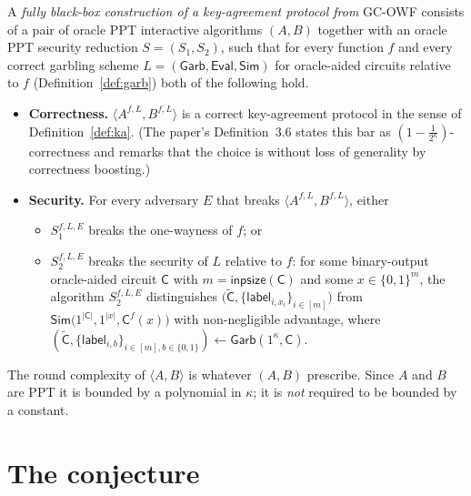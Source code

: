 \documentclass{aicr-conjecture}
\newcommand{\bits}{\{0,1\}}
\newcommand{\Cc}{\mathsf{C}}
\newcommand{\Ct}{\widetilde{\mathsf{C}}}
\newcommand{\lab}{\mathsf{label}}
\newcommand{\labset}[1]{\{\lab_{i,#1}\}}
\newcommand{\Garb}{\mathsf{Garb}}
\newcommand{\Evl}{\mathsf{Eval}}
\newcommand{\Sm}{\mathsf{Sim}}
\newcommand{\inpsize}{\mathsf{inpsize}}
\newcommand{\GCOWF}{\textup{GC-OWF}}
\begin{document}
\begin{definition}\label{def:bb}
A \emph{fully black-box construction of a key-agreement protocol from}
\GCOWF{} consists of a pair of oracle PPT interactive algorithms $(A,B)$
together with an oracle PPT security reduction $S=(S_1,S_2)$, such that
for every function $f$ and every correct garbling scheme
$L=(\Garb,\Evl,\Sm)$ for oracle-aided circuits relative to $f$
(Definition~\ref{def:garb}) both of the following hold.
\begin{itemize}
\item \textbf{Correctness.} $\langle A^{f,L},B^{f,L}\rangle$ is a correct
  key-agreement protocol in the sense of Definition~\ref{def:ka}. (The
  paper's Definition~3.6 states this bar as
  $(1-\frac{1}{2^{\kappa}})$-correctness and remarks that the choice is
  without loss of generality by correctness boosting.)
\item \textbf{Security.} For every adversary $E$ that breaks
  $\langle A^{f,L},B^{f,L}\rangle$, either
  \begin{itemize}
  \item $S_1^{f,L,E}$ breaks the one-wayness of $f$; or
  \item $S_2^{f,L,E}$ breaks the security of $L$ relative to $f$: for some
    binary-output oracle-aided circuit $\Cc$ with $m=\inpsize(\Cc)$ and
    some $x\in\bits^{m}$, the algorithm $S_2^{f,L,E}$ distinguishes
    $\bigl(\Ct,\labset{x_i}_{i\in[m]}\bigr)$ from
    $\Sm\bigl(1^{|\Cc|},1^{|x|},\Cc^{f}(x)\bigr)$ with non-negligible
    advantage, where
    $(\Ct,\labset{b}_{i\in[m],b\in\bits})\leftarrow\Garb(1^{\kappa},\Cc)$.
  \end{itemize}
\end{itemize}
The round complexity of $\langle A,B\rangle$ is whatever $(A,B)$
prescribe. Since $A$ and $B$ are PPT it is bounded by a polynomial in
$\kappa$; it is \emph{not} required to be bounded by a constant.
\end{definition}

\section{The conjecture}\label{sec:conjectures}
\end{document}
